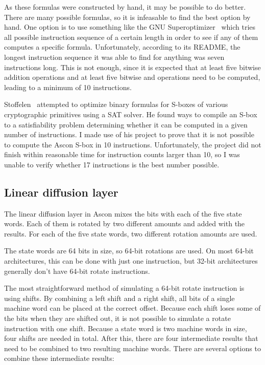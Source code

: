 As these formulas were constructed by hand, it may be possible to do better.
There are many possible formulas, so it is infeasable to find the best option by
hand. One option is to use something like the GNU
Superoptimizer~\cite{superoptimizer} which tries all possible instruction
sequence of a certain length in order to see if any of them computes a specific
formula. Unfortunately, according to its README, the longest instruction
sequence it was able to find for anything was seven instructions long. This is
not enough, since it is expected that at least five bitwise addition operations
and at least five bitwise and operations need to be computed, leading to a
minimum of 10 instructions.

Stoffelen~\cite{sat} attempted to optimize binary formulas for S-boxes of
various cryptographic primitives using a SAT solver. He found ways to compile an
S-box to a satisfiability problem determining whether it can be computed in a
given number of instructions. I made use of his project to prove that it is not
possible to compute the Ascon S-box in 10 instructions. Unfortunately, the
project did not finish within reasonable time for instruction counts larger than
10, so I was unable to verify whether 17 instructions is the best number
possible.

\subsection{Linear diffusion layer}

The linear diffusion layer in Ascon mixes the bits with each of the five state
words. Each of them is rotated by two different amounts and added with the
results. For each of the five state words, two different rotation amounts are
used.

The state words are 64 bits in size, so 64-bit rotations are used. On most
64-bit architectures, this can be done with just one instruction, but 32-bit
architectures generally don't have 64-bit rotate instructions.

The most straightforward method of simulating a 64-bit rotate instruction is
using shifts. By combining a left shift and a right shift, all bits of a single
machine word can be placed at the correct offset. Because each shift loses some
of the bits when they are shifted out, it is not possible to simulate a rotate
instruction with one shift. Because a state word is two machine words in size,
four shifts are needed in total. After this, there are four intermediate results
that need to be combined to two resulting machine words. There are several
options to combine these intermediate results:

